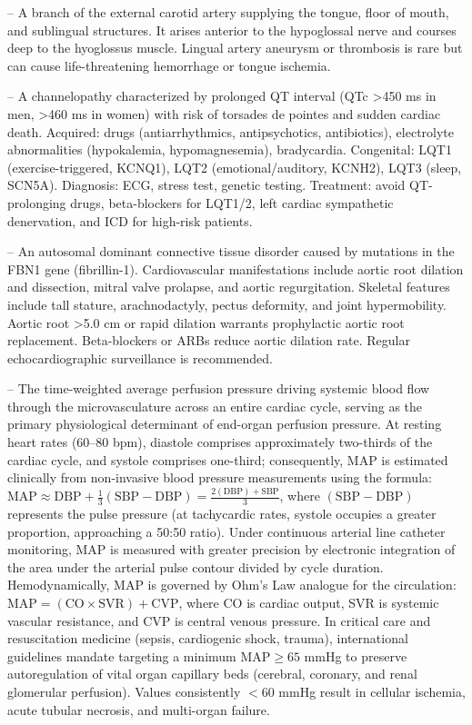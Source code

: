 -- A branch of the external carotid artery supplying the tongue, floor of mouth, and sublingual structures. It arises anterior to the hypoglossal nerve and courses deep to the hyoglossus muscle. Lingual artery aneurysm or thrombosis is rare but can cause life-threatening hemorrhage or tongue ischemia.

-- A channelopathy characterized by prolonged QT interval (QTc >450 ms in men, >460 ms in women) with risk of torsades de pointes and sudden cardiac death. Acquired: drugs (antiarrhythmics, antipsychotics, antibiotics), electrolyte abnormalities (hypokalemia, hypomagnesemia), bradycardia. Congenital: LQT1 (exercise-triggered, KCNQ1), LQT2 (emotional/auditory, KCNH2), LQT3 (sleep, SCN5A). Diagnosis: ECG, stress test, genetic testing. Treatment: avoid QT-prolonging drugs, beta-blockers for LQT1/2, left cardiac sympathetic denervation, and ICD for high-risk patients.

-- An autosomal dominant connective tissue disorder caused by mutations in the FBN1 gene (fibrillin-1). Cardiovascular manifestations include aortic root dilation and dissection, mitral valve prolapse, and aortic regurgitation. Skeletal features include tall stature, arachnodactyly, pectus deformity, and joint hypermobility. Aortic root >5.0 cm or rapid dilation warrants prophylactic aortic root replacement. Beta-blockers or ARBs reduce aortic dilation rate. Regular echocardiographic surveillance is recommended.

-- The time-weighted average perfusion pressure driving systemic blood flow through the microvasculature across an entire cardiac cycle, serving as the primary physiological determinant of end-organ perfusion pressure. At resting heart rates (60--80 bpm), diastole comprises approximately two-thirds of the cardiac cycle, and systole comprises one-third; consequently, MAP is estimated clinically from non-invasive blood pressure measurements using the formula: $\text{MAP} \approx \text{DBP} + \frac{1}{3}(\text{SBP} - \text{DBP}) = \frac{2(\text{DBP}) + \text{SBP}}{3}$, where $(\text{SBP} - \text{DBP})$ represents the pulse pressure (at tachycardic rates, systole occupies a greater proportion, approaching a 50:50 ratio). Under continuous arterial line catheter monitoring, MAP is measured with greater precision by electronic integration of the area under the arterial pulse contour divided by cycle duration. Hemodynamically, MAP is governed by Ohm's Law analogue for the circulation: $\text{MAP} = (\text{CO} \times \text{SVR}) + \text{CVP}$, where CO is cardiac output, SVR is systemic vascular resistance, and CVP is central venous pressure. In critical care and resuscitation medicine (sepsis, cardiogenic shock, trauma), international guidelines mandate targeting a minimum $\text{MAP} \ge 65$ mmHg to preserve autoregulation of vital organ capillary beds (cerebral, coronary, and renal glomerular perfusion). Values consistently $<60$ mmHg result in cellular ischemia, acute tubular necrosis, and multi-organ failure.

